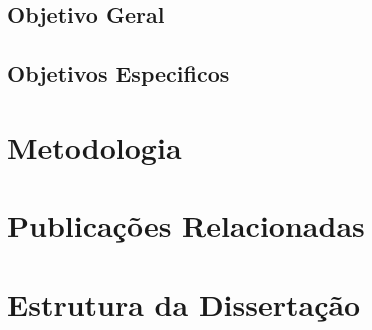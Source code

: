 \subsection{Objetivo Geral}

\subsection{Objetivos Especificos}

\section{Metodologia}

\section{Publicações Relacionadas}

\section{Estrutura da Dissertação}